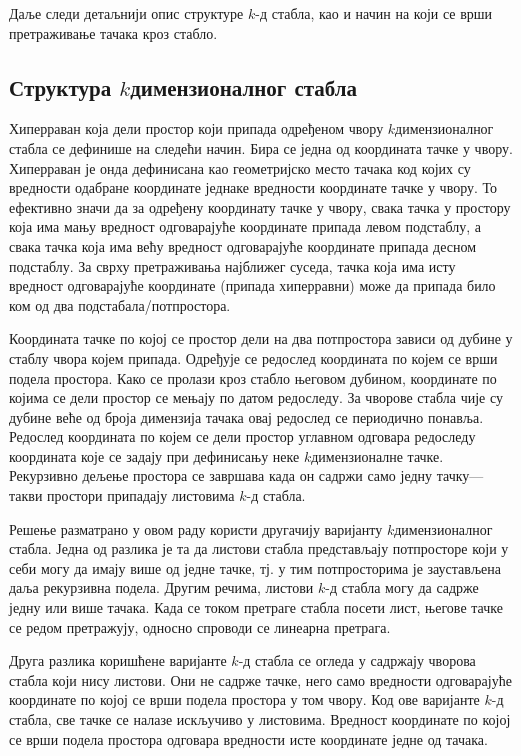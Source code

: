 \documentclass[master]{finthesis}
\newcommand*{\kdim}[1]{\texorpdfstring{$k$\Hyphdash}{k-}димензионал#1}
\newcommand*{\kd}{\texorpdfstring{$k$}{k}-д }
\begin{document}
Даље следи детаљнији опис структуре \kd стабла, као и начин на који се врши претраживање тачака кроз стабло.

\subsection{Структура \kdim{ног} стабла}

Хиперраван која дели простор који припада одређеном чвору \kdim{ног} стабла се дефинише на следећи начин. Бира се једна од координата тачке у чвору. Хиперраван је онда дефинисана као геометријско место тачака код којих су вредности одабране координате једнаке вредности координате тачке у чвору. То ефективно значи да за одређену координату тачке у чвору, свака тачка у простору која има мању вредност одговарајуће координате припада левом подстаблу, а свака тачка која има већу вредност одговарајуће координате припада десном подстаблу. За сврху претраживања најближег суседа, тачка која има исту вредност одговарајуће координате (припада хиперравни) може да припада било ком од два подстабала\slash потпростора.

Координата тачке по којој се простор дели на два потпростора зависи од дубине у стаблу чвора којем припада. Одређује се редослед координата по којем се врши подела простора. Како се пролази кроз стабло његовом дубином, координате по којима се дели простор се мењају по датом редоследу. За чворове стабла чије су дубине веће од броја димензија тачака овај редослед се периодично понавља. Редослед координата по којем се дели простор углавном одговара редоследу координата које се задају при дефинисању неке \kdim{не} тачке. Рекурзивно дељење простора се завршава када он садржи само једну тачку---такви простори припадају листовима \kd стабла.

Решење разматрано у овом  раду користи другачију варијанту \kdim{ног} стабла. Једна од разлика је та да листови стабла представљају потпросторе који у себи могу да имају више од једне тачке, тј. у тим потпросторима је заустављена даља рекурзивна подела. Другим речима, листови \kd стабла могу да садрже једну или више тачака. Када се током претраге стабла посети лист, његове тачке се редом претражују, односно спроводи се линеарна претрага.

Друга разлика коришћене варијанте \kd стабла се огледа у садржају чворова стабла који нису листови. Они не садрже тачке, него само вредности одговарајуће координате по којој се врши подела простора у том чвору. Код ове варијанте \kd стабла, све тачке се налазе искључиво у листовима. Вредност координате по којој се врши подела простора одговара вредности исте координате једне од тачака.
\end{document}

